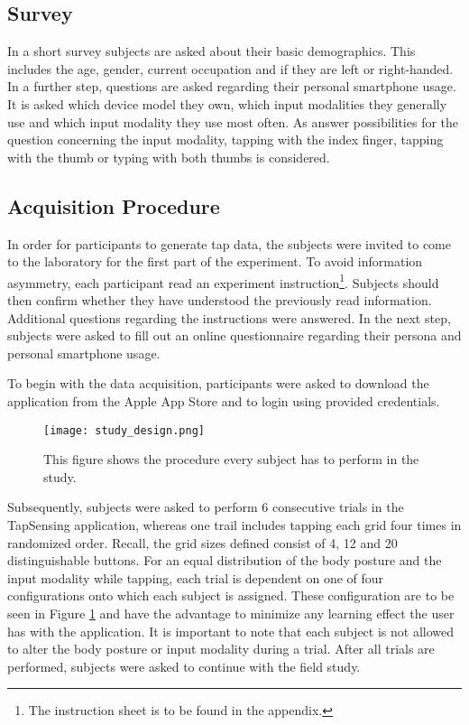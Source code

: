 \subsection{Survey}
In a short survey subjects are asked about their basic demographics. This includes the age, gender, current occupation and if they are left or right-handed. In a further step, questions are asked regarding their personal smartphone usage. It is asked which device model they own, which input modalities they generally use and which input modality they use most often. As answer possibilities for the question concerning the input modality, tapping with the index finger, tapping with the thumb or typing with both thumbs is considered.

\subsection{Acquisition Procedure}
In order for participants to generate tap data, the subjects were invited to come to the laboratory for the first part of the experiment. To avoid information asymmetry, each participant read an experiment instruction\footnote{The instruction sheet is to be found in the appendix.}. Subjects should then confirm whether they have understood the previously read information. Additional questions regarding the instructions were answered. In the next step, subjects were asked to fill out an online questionnaire regarding their persona and personal smartphone usage.

To begin with the data acquisition, participants were asked to download the application from the Apple App Store and to login using provided credentials.

\begin{figure}[h!]
  \centering
  \texttt{[image: study\_design.png]}
  \caption{This figure shows the procedure every subject has to perform in the study.} \label{fig:study_design}
\end{figure}

Subsequently, subjects were asked to perform 6 consecutive trials in the TapSensing application, whereas one trail includes tapping each grid four times in randomized order. Recall, the grid sizes defined consist of 4, 12 and 20 distinguishable buttons. For an equal distribution of the body posture and the input modality while tapping, each trial is dependent on one of four configurations onto which each subject is assigned. These configuration are to be seen in Figure \ref{fig:study_design} and have the advantage to minimize any learning effect the user has with the application. It is important to note that each subject is not allowed to alter the body posture or input modality during a trial. After all trials are performed, subjects were asked to continue with the field study.

